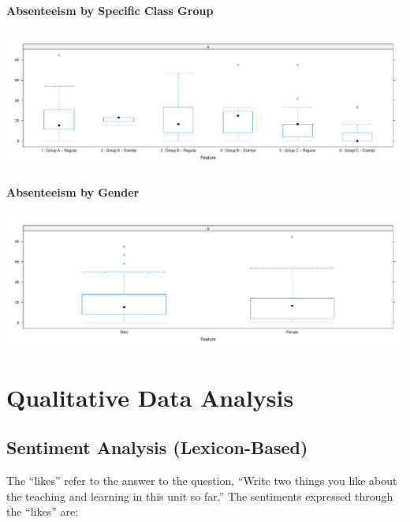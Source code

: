 \documentclass[
]{article}
\begin{document}
\paragraph{Absenteeism by Specific Class
Group}\label{absenteeism-by-specific-class-group}

\includegraphics{AnalysisOfCourseEvaluation-Notebook_files/figure-latex/AbsenteeismBoxandWhiskerSpecificGroup-1.pdf}

\paragraph{Absenteeism by Gender}\label{absenteeism-by-gender}

\includegraphics{AnalysisOfCourseEvaluation-Notebook_files/figure-latex/AbsenteeismBoxandWhiskerGender-1.pdf}

\newpage

\section{Qualitative Data Analysis}\label{qualitative-data-analysis}

\subsection{Sentiment Analysis
(Lexicon-Based)}\label{sentiment-analysis-lexicon-based}

The ``likes'' refer to the answer to the question, ``Write two things
you like about the teaching and learning in this unit so far.'' The
sentiments expressed through the ``likes'' are:
\end{document}
